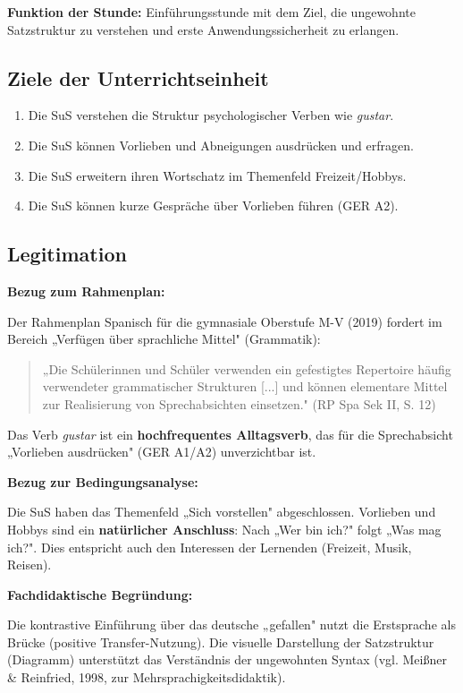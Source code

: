 \documentclass[11pt, a4paper]{article}
\newcommand{\es}[1]{\textcolor{spanisch}{\textit{#1}}}
\begin{document}
\textbf{Funktion der Stunde:} Einführungsstunde mit dem Ziel, die ungewohnte Satzstruktur zu verstehen und erste Anwendungssicherheit zu erlangen.

\subsection{Ziele der Unterrichtseinheit}

\begin{enumerate}[leftmargin=2em]
    \item Die SuS verstehen die Struktur psychologischer Verben wie \es{gustar}.
    \item Die SuS können Vorlieben und Abneigungen ausdrücken und erfragen.
    \item Die SuS erweitern ihren Wortschatz im Themenfeld Freizeit/Hobbys.
    \item Die SuS können kurze Gespräche über Vorlieben führen (GER A2).
\end{enumerate}

\subsection{Legitimation}

\textbf{Bezug zum Rahmenplan:}

Der Rahmenplan Spanisch für die gymnasiale Oberstufe M-V (2019) fordert im Bereich „Verfügen über sprachliche Mittel" (Grammatik):
\begin{quote}
    „Die Schülerinnen und Schüler verwenden ein gefestigtes Repertoire häufig verwendeter grammatischer Strukturen [...] und können elementare Mittel zur Realisierung von Sprechabsichten einsetzen." (RP Spa Sek II, S. 12)
\end{quote}

Das Verb \es{gustar} ist ein \textbf{hochfrequentes Alltagsverb}, das für die Sprechabsicht „Vorlieben ausdrücken" (GER A1/A2) unverzichtbar ist.

\textbf{Bezug zur Bedingungsanalyse:}

Die SuS haben das Themenfeld „Sich vorstellen" abgeschlossen. Vorlieben und Hobbys sind ein \textbf{natürlicher Anschluss}: Nach „Wer bin ich?" folgt „Was mag ich?". Dies entspricht auch den Interessen der Lernenden (Freizeit, Musik, Reisen).

\textbf{Fachdidaktische Begründung:}

Die kontrastive Einführung über das deutsche „gefallen" nutzt die Erstsprache als Brücke (positive Transfer-Nutzung). Die visuelle Darstellung der Satzstruktur (Diagramm) unterstützt das Verständnis der ungewohnten Syntax (vgl. Meißner \& Reinfried, 1998, zur Mehrsprachigkeitsdidaktik).
\end{document}
